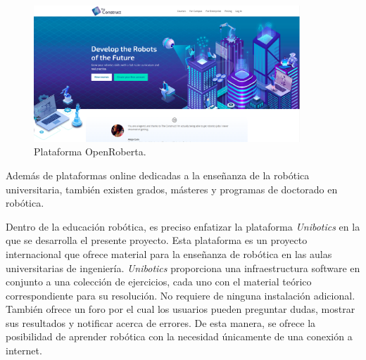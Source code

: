 \documentclass[a4paper, 12pt]{book}
\begin{document}
\begin{itemize}
\begin{figure}[H]
	\centering
    \includegraphics[width=10cm]{img/construct.png}
    \caption{Plataforma OpenRoberta.}
\end{figure}

\end{itemize}
Además de plataformas online dedicadas a la enseñanza de la robótica universitaria, también existen grados, másteres y programas de doctorado en robótica.

Dentro de la educación robótica, es preciso enfatizar la plataforma \textit{Unibotics} en la que se desarrolla el presente proyecto. Esta plataforma es un proyecto internacional que ofrece material para la enseñanza de robótica en las aulas universitarias de ingeniería. \textit{Unibotics} proporciona una infraestructura software en conjunto a una colección de ejercicios, cada uno con el material teórico correspondiente para su resolución. No requiere de ninguna instalación adicional. También ofrece un foro por el cual los usuarios pueden preguntar dudas, mostrar sus resultados y notificar acerca de errores. De esta manera, se ofrece la posibilidad de aprender robótica con la necesidad únicamente de una conexión a internet.
\end{document}
